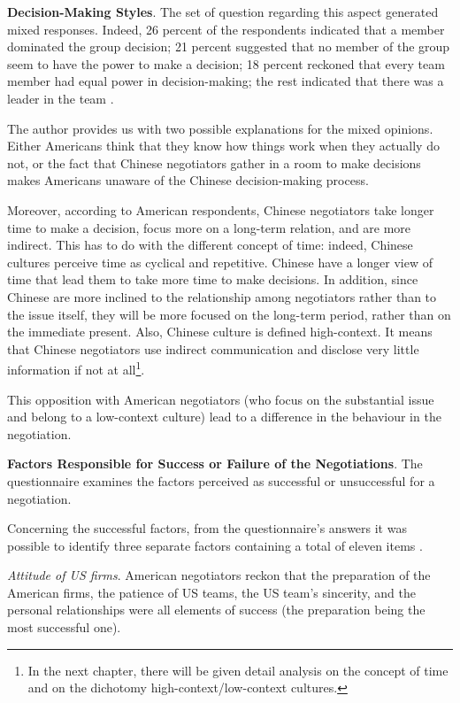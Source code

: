 \documentclass[../main.tex]{subfiles}
\begin{document}
\textbf{Decision-Making Styles}.
The set of question regarding this aspect generated mixed responses. Indeed, 26 percent of the respondents indicated that a member dominated the group decision; 21 percent suggested that no member of the group seem to have the power to make a decision; 18 percent reckoned that every team member had equal power in decision-making; the rest indicated that there was a leader in the team \autocite[63]{tung}.

The author provides us with two possible explanations for the mixed opinions. Either Americans think that they know how things work when they actually do not, or the fact that Chinese negotiators gather in a room to make decisions makes Americans unaware of the Chinese decision-making process.

Moreover, according to American respondents, Chinese negotiators take longer time to make a decision, focus more on a long-term relation, and are more indirect. This has to do with the different concept of time: indeed, Chinese cultures perceive time as cyclical and repetitive. Chinese have a longer view of time that lead them to take more time to make decisions. In addition, since Chinese are more inclined to the relationship among negotiators rather than to the issue itself, they will be more focused on the long-term period, rather than on the immediate present. Also, Chinese culture is defined high-context. It means that Chinese negotiators use indirect communication and disclose very little information if not at all\footnote{In the next chapter, there will be given detail analysis on the concept of time and on the dichotomy high-context/low-context cultures.}.

This opposition with American negotiators (who focus on the substantial issue and belong to a low-context culture) lead to a difference in the behaviour in the negotiation.

\textbf{Factors Responsible for Success or Failure of the Negotiations}. The questionnaire examines the factors perceived as successful or unsuccessful for a negotiation.

Concerning the successful factors, from the questionnaire's answers it was possible to identify three separate factors containing a total of eleven items \autocite[66]{tung}.

\textit{Attitude of US firms}. American negotiators reckon that the preparation of the American firms, the patience of US teams, the US team's sincerity, and the personal relationships were all elements of success (the preparation being the most successful one).
\end{document}
